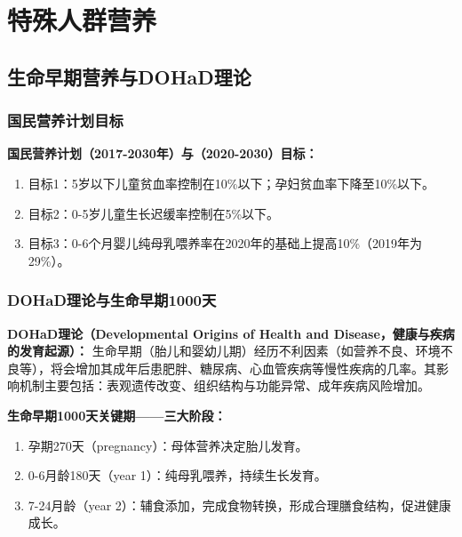 \chapter{特殊人群营养}
\setcounter{chapter}{4}

\section{生命早期营养与DOHaD理论}

\subsection{国民营养计划目标}

\begin{tipbox}
\textbf{国民营养计划（2017-2030年）与（2020-2030）目标：}
\begin{enumerate}[leftmargin=*]
    \item 目标1：5岁以下儿童贫血率控制在10\%以下；孕妇贫血率下降至10\%以下。
    \item 目标2：0-5岁儿童生长迟缓率控制在5\%以下。
    \item 目标3：0-6个月婴儿纯母乳喂养率在2020年的基础上提高10\%（2019年为29\%）。
\end{enumerate}
\end{tipbox}

\subsection{DOHaD理论与生命早期1000天}

\begin{keybox}
\textbf{DOHaD理论（Developmental Origins of Health and Disease，健康与疾病的发育起源）：}
生命早期（胎儿和婴幼儿期）经历不利因素（如营养不良、环境不良等），将会增加其成年后患肥胖、糖尿病、心血管疾病等慢性疾病的几率。其影响机制主要包括：表观遗传改变、组织结构与功能异常、成年疾病风险增加。

\textbf{生命早期1000天关键期——三大阶段：}
\begin{enumerate}[leftmargin=*]
    \item 孕期270天（pregnancy）：母体营养决定胎儿发育。
    \item 0-6月龄180天（year 1）：纯母乳喂养，持续生长发育。
    \item 7-24月龄（year 2）：辅食添加，完成食物转换，形成合理膳食结构，促进健康成长。
\end{enumerate}
\end{keybox}

